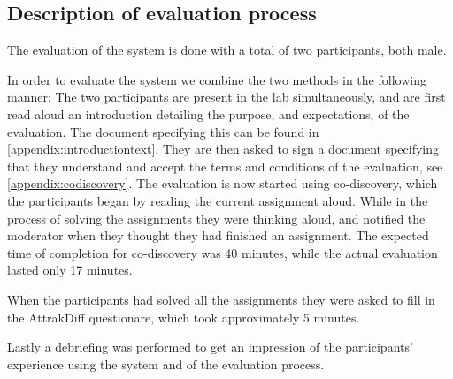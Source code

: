 \subsection{Description of evaluation process}
The evaluation of the system is done with a total of two participants, both male.

In order to evaluate the system we combine the two methods in the following manner: The two participants are present in the lab simultaneously, and are first read aloud an introduction detailing the purpose, and expectations, of the evaluation. The document specifying this can be found in \autoref{appendix:introductiontext}. They are then asked to sign a document specifying that they understand and accept the terms and conditions of the evaluation, see \autoref{appendix:codiscovery}.
The evaluation is now started using co-discovery, which the participants began by reading the current assignment aloud. While in the process of solving the assignments they were thinking aloud, and notified the moderator when they thought they had finished an assignment. The expected time of completion for co-discovery was 40 minutes, while the actual evaluation lasted only 17 minutes.

When the participants had solved all the assignments they were asked to fill in the AttrakDiff questionare, which took approximately 5 minutes.

Lastly a debriefing was performed to get an impression of the participants' experience using the system and of the evaluation process.
